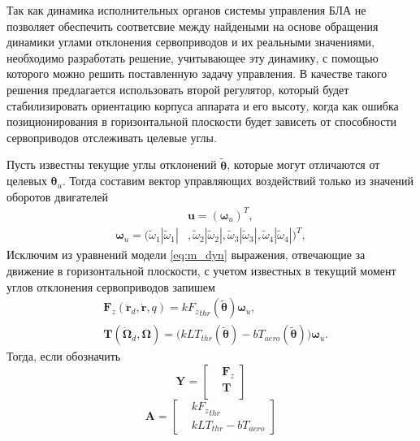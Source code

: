 Так как динамика исполнительных органов системы управления БЛА не позволяет обеспечить соответсвие между найдеными на основе обращения динамики углами отклонения сервоприводов и их реальными значениями, необходимо разработать решение, учитывающее эту динамику, с помощью которого можно решить поставленную задачу управления.
В качестве такого решения предлагается использовать второй регулятор, который будет стабилизировать ориентацию корпуса аппарата и его высоту, когда как ошибка позиционирования в горизонтальной плоскости будет зависеть от способности сервоприводов отслеживать целевые углы.

Пусть известны текущие углы отклонений $\tilde {\bm {\theta}}$, которые могут отличаются от целевых $\bm \theta_u$.
Тогда составим вектор управляющих воздействий только из значений оборотов двигателей
\begin{equation} \label{eq:m_cut_ctrl_out}
\begin{aligned}
&\bm{u} = (\bm \omega_u)^T,
\\
\bm \omega_u =
(\tilde\omega_1 |\tilde\omega_1|&,
\tilde\omega_2 |\tilde\omega_2|,
\tilde\omega_3 |\tilde\omega_3|,
\tilde\omega_4 |\tilde\omega_4|)^T,
\end{aligned}
\end{equation}
Исключим из уравнений модели \eqref{eq:m_dyn} выражения, отвечающие за движение в горизонтальной плоскости, с учетом известных в текущий момент углов отклонения сервоприводов запишем
\begin{equation} \label{eq:m_cut_dyn}
\begin{aligned}
&\bm F_z(\ddot{\bm r}_d, \dot{\bm r}, q) =
k {F_z}_{thr} (\tilde{\bm \theta}) \bm \omega_u,\\
&\bm T(\dot{\bm \Omega}_d, \bm\Omega) =
\Big(
kLT_{thr}(\tilde{\bm \theta}) - bT_{aero}(\tilde{\bm \theta})
\Big)
\bm \omega_u.
\end{aligned}
\end{equation}
Тогда, если обозначить
\begin{equation}
\bm Y = 
\begin{bmatrix}
&\bm F_z \\
&\bm T \\
\end{bmatrix}
\end{equation}
\begin{equation}
\bm A = 
\begin{bmatrix}
&k {F_z}_{thr} \\
&kLT_{thr} - bT_{aero}
\end{bmatrix}
\end{equation}
